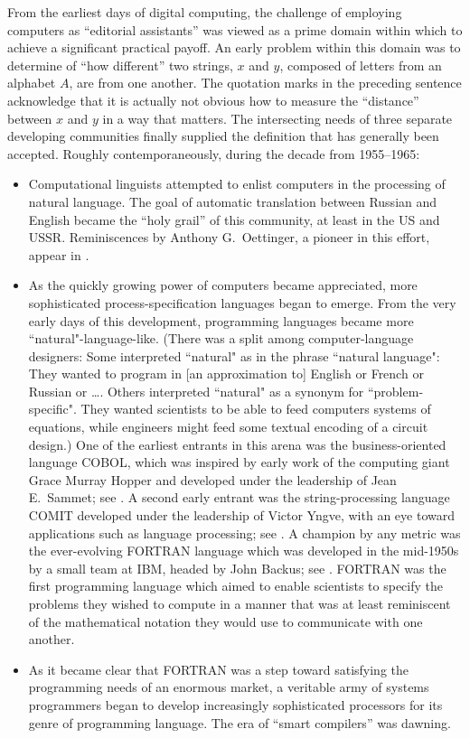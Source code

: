 From the earliest days of digital computing, the challenge of employing computers as ``editorial assistants'' was viewed as a prime domain within which to achieve a significant practical payoff.  An early problem within this domain was to determine of ``how different'' two strings, $x$ and $y$, composed of letters from an alphabet $A$, are from one another.  The quotation marks in the preceding sentence acknowledge that it is actually not obvious how to measure the ``distance'' between $x$ and $y$ in a way that matters.  The intersecting needs of three separate developing communities finally supplied the definition that has generally been accepted.  Roughly contemporaneously, during the decade from 1955--1965:
  
 
  \begin{itemize}
  \item
Computational linguists attempted to enlist computers in the processing of natural language.  The goal of automatic translation between Russian and English became the ``holy grail'' of this community, at least in the US and USSR.  Reminiscences by Anthony G.~Oettinger,  a pioneer in this effort, appear in \cite{Hutchins00}.
   \medskip\item
As the quickly growing power of computers became appreciated, more sophisticated process-specification languages began to emerge.  From the very early days of this development, programming languages became more ``natural"-language-like.  (There was a split among computer-language designers:  Some interpreted ``natural" as in the phrase ``natural language":  They wanted to program in [an approximation to] English or French or Russian or \ldots.  Others interpreted ``natural" as a synonym for ``problem-specific".  They wanted scientists to be able to feed computers systems of equations, while engineers might feed some textual encoding of a circuit design.) One of the earliest entrants in this arena was the business-oriented language COBOL, which was inspired by early work of the computing giant Grace Murray Hopper and developed under the leadership of Jean E.~Sammet; see \cite{Sammet78}.  A second early entrant was the string-processing language COMIT developed under the leadership of Victor Yngve, with an eye toward applications such as language processing; see \cite{Yngve}.  A champion by any metric was the ever-evolving FORTRAN language which was developed in the mid-1950s by a small team at IBM, headed by John Backus; see \cite{Backus-etal57}.  FORTRAN was the first programming language which aimed to enable scientists to specify the problems they wished to compute in a manner that was at least reminiscent of the mathematical notation they would use to communicate with one another.
   \medskip\item
As it became clear that FORTRAN was a step toward satisfying the programming needs of an enormous market, a veritable army of systems programmers began to develop increasingly sophisticated processors for its genre of programming language.  The era of ``smart compilers'' was dawning.
   \end{itemize}

